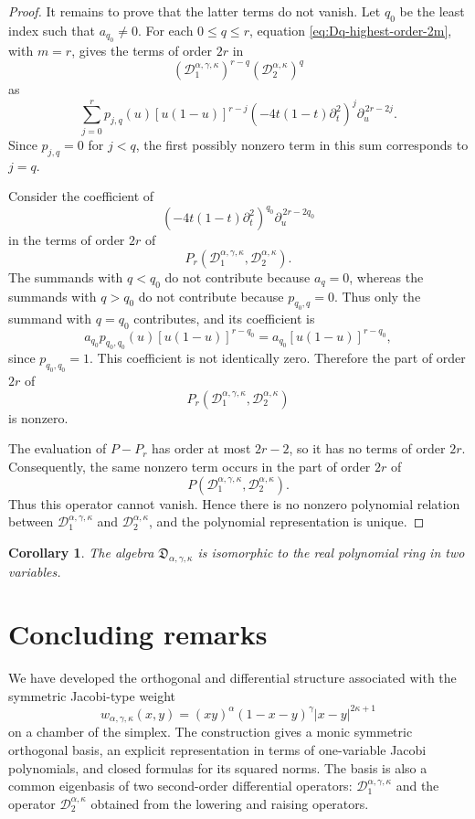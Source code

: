 \documentclass[reqno,10pt]{amsart}
\theoremstyle{plain}
\newtheorem{corollary}[theorem]{Corollary}
\numberwithin{equation}{section}
\numberwithin{figure}{section}
\begin{document}
\begin{proof}
It remains to prove that the latter terms do not vanish. Let \(q_0\) be
the least index such that \(a_{q_0}\neq0\). For each
\(0\leq q\leq r\), equation \eqref{eq:Dq-highest-order-2m}, with
\(m=r\), gives the terms of order \(2r\) in
\[
\left(\mathcal D_1^{\alpha,\gamma,\kappa}\right)^{r-q}
\left(\mathcal D_2^{\alpha,\kappa}\right)^q
\]
as
\[
\sum_{j=0}^{r}
p_{j,q}(u)[u(1-u)]^{r-j}
\left(-4t(1-t)\partial_t^2\right)^j
\partial_u^{\,2r-2j}.
\]
Since \(p_{j,q}=0\) for \(j<q\), the first possibly nonzero term in this
sum corresponds to \(j=q\).

Consider the coefficient of
\[
\left(-4t(1-t)\partial_t^2\right)^{q_0}
\partial_u^{\,2r-2q_0}
\]
in the terms of order \(2r\) of
\[
P_r\left(
\mathcal D_1^{\alpha,\gamma,\kappa},
\mathcal D_2^{\alpha,\kappa}
\right).
\]
The summands with \(q<q_0\) do not contribute because \(a_q=0\), whereas
the summands with \(q>q_0\) do not contribute because
\(p_{q_0,q}=0\). Thus only the summand with \(q=q_0\) contributes, and
its coefficient is
\[
a_{q_0}p_{q_0,q_0}(u)[u(1-u)]^{r-q_0}
=
a_{q_0}[u(1-u)]^{r-q_0},
\]
since \(p_{q_0,q_0}=1\). This coefficient is not identically zero.
Therefore the part of order \(2r\) of
\[
P_r\left(
\mathcal D_1^{\alpha,\gamma,\kappa},
\mathcal D_2^{\alpha,\kappa}
\right)
\]
is nonzero.

The evaluation of \(P-P_r\) has order at most \(2r-2\), so it has no
terms of order \(2r\). Consequently, the same nonzero term occurs in
the part of order \(2r\) of
\[
P\left(
\mathcal D_1^{\alpha,\gamma,\kappa},
\mathcal D_2^{\alpha,\kappa}
\right).
\]
Thus this operator cannot vanish. Hence there is no nonzero polynomial
relation between \(\mathcal D_1^{\alpha,\gamma,\kappa}\) and
\(\mathcal D_2^{\alpha,\kappa}\), and the polynomial representation is
unique.
\end{proof}

\begin{corollary}%
The algebra
$\mathfrak{D}_{\alpha,\gamma,\kappa}$ is isomorphic to the real polynomial ring in two variables.
\end{corollary}


\section{Concluding remarks}

We have developed the orthogonal and differential structure associated with
the symmetric Jacobi-type weight
\[
w_{\alpha,\gamma,\kappa}(x,y)
=
(xy)^\alpha(1-x-y)^\gamma |x-y|^{2\kappa+1}
\]
on a chamber of the simplex. The construction gives a monic symmetric
orthogonal basis, an explicit representation in terms of one-variable Jacobi
polynomials, and closed formulas for its squared norms. The basis is also a
common eigenbasis of two second-order differential operators:
\(\mathcal D_1^{\alpha,\gamma,\kappa}\) and the operator
\(\mathcal D_2^{\alpha,\kappa}\) obtained from the lowering and raising
operators.
\end{document}
